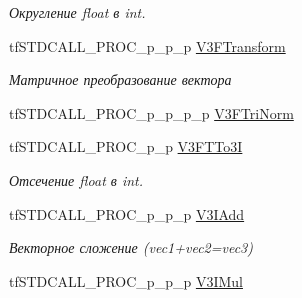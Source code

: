 \begin{DoxyCompactItemize}
\begin{DoxyCompactList}\small\item\em Округление float в int. \end{DoxyCompactList}\item 
\hypertarget{structs_functions_vector_c_p_u_a5ccd1d0ca940ffaf1b312847d9a46fb4}{tf\-S\-T\-D\-C\-A\-L\-L\-\_\-\-P\-R\-O\-C\-\_\-p\-\_\-p\-\_\-p \hyperlink{structs_functions_vector_c_p_u_a5ccd1d0ca940ffaf1b312847d9a46fb4}{V3\-F\-Transform}}\label{structs_functions_vector_c_p_u_a5ccd1d0ca940ffaf1b312847d9a46fb4}

\begin{DoxyCompactList}\small\item\em Матричное преобразование вектора \end{DoxyCompactList}\item 
tf\-S\-T\-D\-C\-A\-L\-L\-\_\-\-P\-R\-O\-C\-\_\-p\-\_\-p\-\_\-p\-\_\-p \hyperlink{structs_functions_vector_c_p_u_aabd58e26ce3e6b7934ff0e059382aca8}{V3\-F\-Tri\-Norm}
\item 
\hypertarget{structs_functions_vector_c_p_u_a6bb0441c672653e3e92047fa13dd469e}{tf\-S\-T\-D\-C\-A\-L\-L\-\_\-\-P\-R\-O\-C\-\_\-p\-\_\-p \hyperlink{structs_functions_vector_c_p_u_a6bb0441c672653e3e92047fa13dd469e}{V3\-F\-T\-To3\-I}}\label{structs_functions_vector_c_p_u_a6bb0441c672653e3e92047fa13dd469e}

\begin{DoxyCompactList}\small\item\em Отсечение float в int. \end{DoxyCompactList}\item 
\hypertarget{structs_functions_vector_c_p_u_aed001064a8f65a84f45560a1236dca63}{tf\-S\-T\-D\-C\-A\-L\-L\-\_\-\-P\-R\-O\-C\-\_\-p\-\_\-p\-\_\-p \hyperlink{structs_functions_vector_c_p_u_aed001064a8f65a84f45560a1236dca63}{V3\-I\-Add}}\label{structs_functions_vector_c_p_u_aed001064a8f65a84f45560a1236dca63}

\begin{DoxyCompactList}\small\item\em Векторное сложение (vec1+vec2=vec3) \end{DoxyCompactList}\item 
\hypertarget{structs_functions_vector_c_p_u_a194c9af9ba52941dc2b6a412971b616a}{tf\-S\-T\-D\-C\-A\-L\-L\-\_\-\-P\-R\-O\-C\-\_\-p\-\_\-p\-\_\-p \hyperlink{structs_functions_vector_c_p_u_a194c9af9ba52941dc2b6a412971b616a}{V3\-I\-Mul}}\label{structs_functions_vector_c_p_u_a194c9af9ba52941dc2b6a412971b616a}


\end{DoxyCompactItemize}
